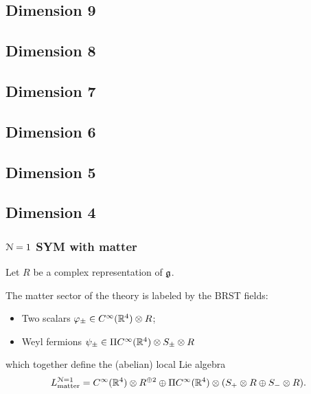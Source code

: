 \documentclass[10pt, oneside]{article}
\begin{document}
\subsection{Dimension 9}


\subsection{Dimension 8}


\subsection{Dimension 7}


\subsection{Dimension 6}



\subsection{Dimension 5}


\subsection{Dimension 4}


\subsubsection{$\mathcal N=1$ SYM with matter} 

Let $R$ be a complex representation of $\mathfrak{g}$.

The matter sector of the theory is labeled by the BRST fields:
\begin{itemize}
\item Two scalars $\varphi_{\pm} \in C^\infty (\mathbb R^4) \otimes R$;
\item Weyl fermions $\psi_{\pm} \in \Pi C^\infty(\mathbb R^4) \otimes S_{\pm} \otimes R$ 
\end{itemize} 
which together define the (abelian) local Lie algebra
\[
L_{\rm matter}^{\mathcal N=1} = C^\infty (\mathbb R^4) \otimes R^{\oplus 2} \oplus  \Pi C^\infty(\mathbb R^4) \otimes (S_{+}  \otimes R \oplus S_- \otimes R) .
\]
\end{document}
